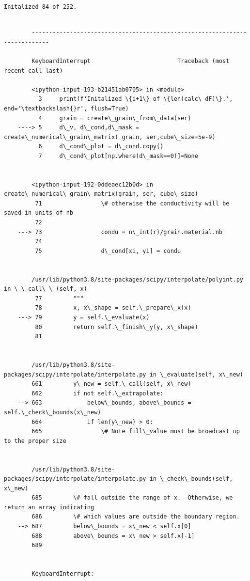 \documentclass[11pt]{article}
\begin{document}
    \begin{Verbatim}[commandchars=\\\{\}]
Initalized 84 of 252.
    \end{Verbatim}

    \begin{Verbatim}[commandchars=\\\{\}]

        ---------------------------------------------------------------------------

        KeyboardInterrupt                         Traceback (most recent call last)

        <ipython-input-193-b21451ab0705> in <module>
          3     print(f'Initalized \{i+1\} of \{len(calc\_dF)\}.', end='\textbackslash{}r', flush=True)
          4     grain = create\_grain\_from\_data(ser)
    ----> 5     d\_v, d\_cond,d\_mask = create\_numerical\_grain\_matrix( grain, ser,cube\_size=5e-9)
          6     d\_cond\_plot = d\_cond.copy()
          7     d\_cond\_plot[np.where(d\_mask==0)]=None


        <ipython-input-192-0ddeaec12b0d> in create\_numerical\_grain\_matrix(grain, ser, cube\_size)
         71                 \# otherwise the conductivity will be saved in units of nb
         72 
    ---> 73                 condu = n\_int(r)/grain.material.nb
         74 
         75                 d\_cond[xi, yi] = condu


        /usr/lib/python3.8/site-packages/scipy/interpolate/polyint.py in \_\_call\_\_(self, x)
         77         """
         78         x, x\_shape = self.\_prepare\_x(x)
    ---> 79         y = self.\_evaluate(x)
         80         return self.\_finish\_y(y, x\_shape)
         81 


        /usr/lib/python3.8/site-packages/scipy/interpolate/interpolate.py in \_evaluate(self, x\_new)
        661         y\_new = self.\_call(self, x\_new)
        662         if not self.\_extrapolate:
    --> 663             below\_bounds, above\_bounds = self.\_check\_bounds(x\_new)
        664             if len(y\_new) > 0:
        665                 \# Note fill\_value must be broadcast up to the proper size


        /usr/lib/python3.8/site-packages/scipy/interpolate/interpolate.py in \_check\_bounds(self, x\_new)
        685         \# fall outside the range of x.  Otherwise, we return an array indicating
        686         \# which values are outside the boundary region.
    --> 687         below\_bounds = x\_new < self.x[0]
        688         above\_bounds = x\_new > self.x[-1]
        689 


        KeyboardInterrupt: 

    \end{Verbatim}
\end{document}

